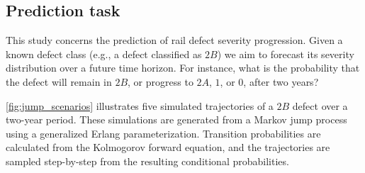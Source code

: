 

\subsection{Prediction task} \label{sec:prediction_task}
This study concerns the prediction of rail defect severity progression. Given a known defect class (e.g., a defect classified as $2B$) we aim to forecast its severity distribution over a future time horizon. For instance, what is the probability that the defect will remain in $2B$, or progress to $2A$, $1$, or $0$, after two years?

\cref{fig:jump_scenarios} illustrates five simulated trajectories of a $2B$ defect over a two-year period. These simulations are generated from a Markov jump process using a generalized Erlang parameterization. Transition probabilities are calculated from the Kolmogorov forward equation, and the trajectories are sampled step-by-step from the resulting conditional probabilities.

